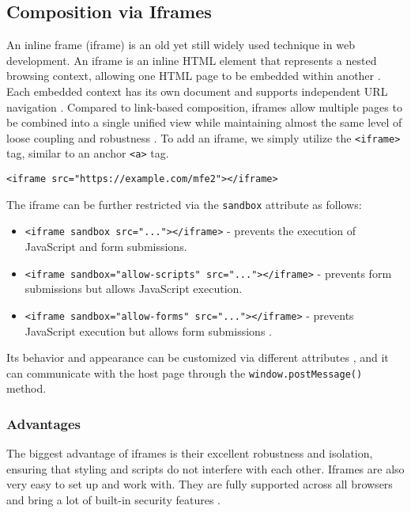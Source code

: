 \subsection{Composition via Iframes}
An inline frame (iframe) is an old yet still widely used technique in web development. An iframe is an inline HTML element that represents a nested browsing context, allowing one HTML page to be embedded within another \cite{iFrame}. Each embedded context has its own document and supports independent URL navigation \cite{iFrame}. Compared to link-based composition, iframes allow multiple pages to be combined into a single unified view while maintaining almost the same level of loose coupling and robustness \cite{MezzaliraBuildingMf}. To add an iframe, we simply utilize the \texttt{<iframe>} tag, similar to an anchor \texttt{<a>} tag.
\begin{verbatim}
<iframe src="https://example.com/mfe2"></iframe>
\end{verbatim}
The iframe can be further restricted via the \texttt{sandbox} attribute as follows:
\begin{itemize}
    \item \texttt{<iframe sandbox src="..."></iframe>} - prevents the execution of JavaScript and form submissions.
    \item \texttt{<iframe sandbox="allow-scripts" src="..."></iframe>} - prevents form submissions but allows JavaScript execution.
    \item \texttt{<iframe sandbox="allow-forms" src="..."></iframe>} - prevents JavaScript execution but allows form submissions \cite{MezzaliraBuildingMf}.
\end{itemize}
Its behavior and appearance can be customized via different attributes \cite{iFrame}, and it can communicate with the host page through the \texttt{window.postMessage()} method.

\subsubsection{Advantages}
The biggest advantage of iframes is their excellent robustness and isolation, ensuring that styling and scripts do not interfere with each other. Iframes are also very easy to set up and work with. They are fully supported across all browsers and bring a lot of built-in security features \cite{Geers}\cite{Jackson}\cite{MezzaliraBuildingMf}.

